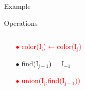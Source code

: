 \begin{frame}{Example}
\begin{overlayarea}{\textwidth}{\textheight}
{\begin{block}{Operations}
\begin{columns}[T]
      \begin{column}{.48\textwidth}
        \begin{itemize}
          \item[\textcolor{red}{$\bullet$}]\textcolor{red}{color($\mathrm{I_{i}}$)$\leftarrow$color($\mathrm{I_{j}}$)}
          \item[$\bullet$]find($\mathrm{I_{j-1}}$) = $\mathrm{I_{-1}}$
          \item[\textcolor{red}{$\bullet$}]\textcolor{red}{union($\mathrm{I_{j}}$,find($\mathrm{I_{j-1}}$))}
        \end{itemize}
      \end{column}
      \end{columns}  
    \end{block}
  }
\end{overlayarea}
\end{frame}
